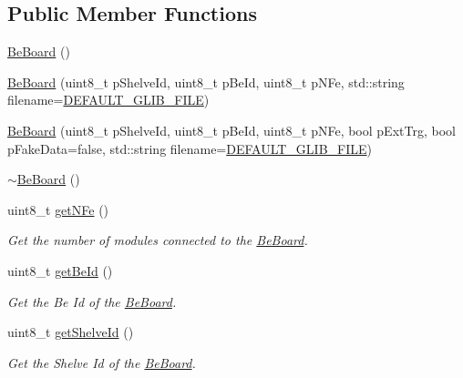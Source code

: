 \subsection*{Public Member Functions}
\begin{DoxyCompactItemize}
\item 
\hyperlink{class_ph2___hw_description_1_1_be_board_a3bd1302a3dbf6ff0ba59dab710cfa537}{Be\-Board} ()
\item 
\hyperlink{class_ph2___hw_description_1_1_be_board_a3d36a1d2b408a2030618a06fa27c77d5}{Be\-Board} (uint8\-\_\-t p\-Shelve\-Id, uint8\-\_\-t p\-Be\-Id, uint8\-\_\-t p\-N\-Fe, std\-::string filename=\hyperlink{_definition_8h_a9a33e5f7e6ec12c2dd3f55317c6c16f1}{D\-E\-F\-A\-U\-L\-T\-\_\-\-G\-L\-I\-B\-\_\-\-F\-I\-L\-E})
\item 
\hyperlink{class_ph2___hw_description_1_1_be_board_ae6ffc11657e275575114eb916b706c40}{Be\-Board} (uint8\-\_\-t p\-Shelve\-Id, uint8\-\_\-t p\-Be\-Id, uint8\-\_\-t p\-N\-Fe, bool p\-Ext\-Trg, bool p\-Fake\-Data=false, std\-::string filename=\hyperlink{_definition_8h_a9a33e5f7e6ec12c2dd3f55317c6c16f1}{D\-E\-F\-A\-U\-L\-T\-\_\-\-G\-L\-I\-B\-\_\-\-F\-I\-L\-E})
\item 
\hyperlink{class_ph2___hw_description_1_1_be_board_a9e763718213e7106b7a6ba1ccb5d23e2}{$\sim$\-Be\-Board} ()
\item 
uint8\-\_\-t \hyperlink{class_ph2___hw_description_1_1_be_board_a2fa9bc6ee1db78f046186117f162eb1e}{get\-N\-Fe} ()
\begin{DoxyCompactList}\small\item\em Get the number of modules connected to the \hyperlink{class_ph2___hw_description_1_1_be_board}{Be\-Board}. \end{DoxyCompactList}\item 
uint8\-\_\-t \hyperlink{class_ph2___hw_description_1_1_be_board_a81c2071b04bb2c4541f0b30bcf2ff1ba}{get\-Be\-Id} ()
\begin{DoxyCompactList}\small\item\em Get the Be Id of the \hyperlink{class_ph2___hw_description_1_1_be_board}{Be\-Board}. \end{DoxyCompactList}\item 
uint8\-\_\-t \hyperlink{class_ph2___hw_description_1_1_be_board_af241f127cad3f32dc0aad9bcc6422f2a}{get\-Shelve\-Id} ()
\begin{DoxyCompactList}\small\item\em Get the Shelve Id of the \hyperlink{class_ph2___hw_description_1_1_be_board}{Be\-Board}. \end{DoxyCompactList}\item 

\end{DoxyCompactItemize}
